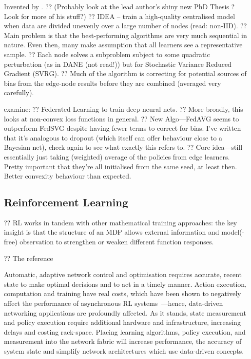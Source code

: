 Invented by \textcite{DBLP:journals/corr/KonecnyMRR16}.
?? (Probably look at the lead author's shiny new PhD Thesis \cite{DBLP:journals/corr/Konecny17}? Look for more of his stuff?)
?? IDEA -- train a high-quality centralised model when data are divided unevenly over a large number of nodes (read: non-IID).
?? Main problem is that the best-performing algorithms are very much sequential in nature. Even then, many make assumption that all learners see a representative sample.
?? Each node solves a subproblem subject to some quadratic perturbation (as in DANE \cite{DBLP:conf/icml/ShamirS014} (not read!)) but for Stochastic Variance Reduced Gradient (SVRG).
?? Much of the algorithm is correcting for potential sources of bias from the edge-node results before they are combined (averaged very carefully).

\textcite{DBLP:conf/aistats/McMahanMRHA17} examine:
?? Federated Learning to train deep neural nets.
?? More broadly, this looks at non-convex loss functions in general.
?? New Algo---FedAVG seems to outperform FedSVG despite having fewer terms to correct for bias. I've written that it's analogous to dropout (which itself can offer behaviour close to a Bayesian net), check again to see what exactly this refers to.
?? Core idea---still essentially just taking (weighted) average of the policies from edge learners. Pretty important that they're all initialised from the same seed, at least then. Better convexity behaviour than expected.

\subsection{Reinforcement Learning}

?? RL works in tandem with other mathematical training approaches: the key insight is that the structure of an MDP allows external information and model(-free) observation to strengthen or weaken different function responses.

?? The reference~\parencite{RL2E}

Automatic, adaptive network control and optimisation requires accurate, recent state to make optimal decisions and to act in a timely manner.
Action execution, computation and training have real costs, which have been shown to negatively affect the performance of asynchronous RL systems~\cite{DBLP:journals/firai/TravnikMSP18}---hence, data-driven networking applications are profoundly affected.
As it stands, state measurement and policy execution require additional hardware and infrastructure, increasing delays and costing rack-space.
Placing learning algorithms, policy execution, and measurement into the network fabric will increase performance, the accuracy of system state and simplify network architectures which use data-driven concepts.

